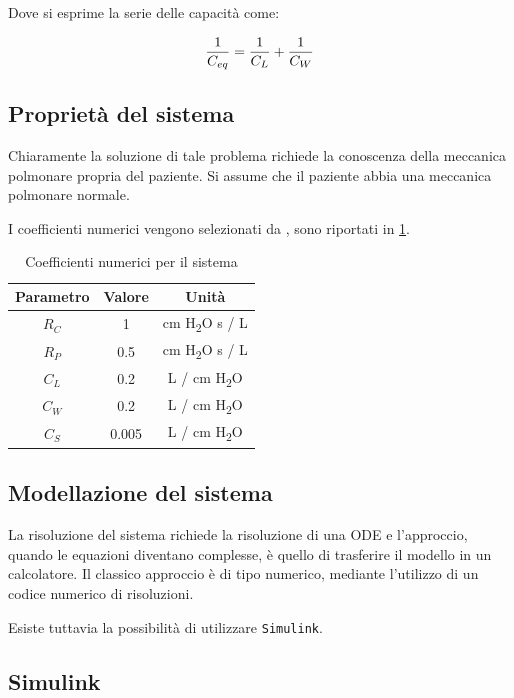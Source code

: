Dove si esprime la serie delle capacità come: 

\begin{equation}
	{1\over C_{eq}}={1\over C_{L}}+{1\over C_{W}}
\end{equation}



\subsection{Proprietà del sistema}


Chiaramente la soluzione di tale problema richiede la conoscenza della meccanica polmonare propria del paziente. Si assume che il paziente abbia una meccanica polmonare normale.

I coefficienti numerici vengono selezionati da \citeauthor{khoo_physiological_2018} \cite{khoo_physiological_2018}, sono riportati in \cref{tab:coefficienti}.


\begin{table}[h!]
	\centering
	\begin{tabular}{|c|c|c|}
		\hline
		Parametro & Valore & Unità \\ \hline
		$R_C$ & 1 & cm H\textsubscript{2}O s / L \\ \hline
		$R_P$ & 0.5 & cm H\textsubscript{2}O s / L \\ \hline
		$C_L$ & 0.2 & L / cm  H\textsubscript{2}O \\ \hline
		$C_W$ & 0.2 & L / cm  H\textsubscript{2}O \\ \hline
		$C_S$ & 0.005 & L / cm  H\textsubscript{2}O \\ \hline
	\end{tabular}
\caption{Coefficienti numerici per il sistema \cite{khoo_physiological_2018}}
\label{tab:coefficienti}
\end{table}

\subsection{Modellazione del sistema}

La risoluzione del sistema richiede la risoluzione di una ODE e l'approccio, quando le equazioni diventano complesse, è quello di trasferire il modello in un calcolatore. Il classico approccio è di tipo numerico, mediante l'utilizzo di un codice numerico di risoluzioni.

Esiste tuttavia la possibilità di utilizzare  \texttt{Simulink}. 

\subsection{Simulink}


